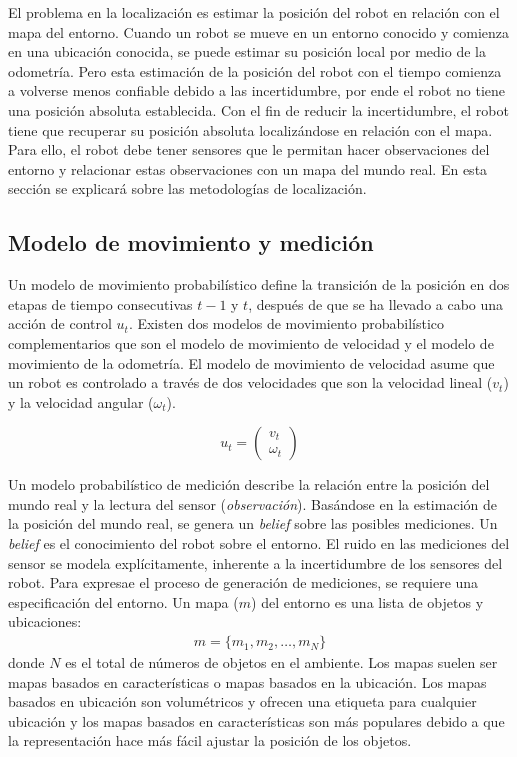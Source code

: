 El problema en la localizaci\'on es estimar la posici\'on del robot en 
relaci\'on con el mapa del entorno. Cuando un robot se mueve en un entorno 
conocido y comienza en una ubicaci\'on conocida, se puede estimar su posici\'on 
local por medio de la odometr\'ia. Pero esta estimaci\'on de la posici\'on del robot
con el tiempo comienza a volverse menos confiable debido a las incertidumbre,
por ende el robot no tiene una posici\'on absoluta establecida. Con el fin de reducir 
la incertidumbre, el robot tiene que recuperar su posici\'on absoluta localiz\'andose 
en relaci\'on con el mapa. Para ello, el robot debe tener sensores que le permitan 
hacer observaciones del entorno y relacionar estas observaciones con un mapa 
del mundo real. En esta secci\'on se explicar\'a sobre las metodolog\'ias 
de localizaci\'on.

\subsection{Modelo de movimiento y medici\'on}

Un modelo de movimiento probabil\'istico define la transici\'on de la posici\'on 
en dos etapas de tiempo consecutivas $t-1$ y $t$, despu\'es de que se ha llevado 
a cabo una acci\'on de control $u_{t}$. Existen dos modelos de movimiento 
probabil\'istico complementarios que son el modelo de movimiento de velocidad y 
el modelo de movimiento de la odometr\'ia. El modelo de movimiento de velocidad 
asume que un robot es controlado a trav\'es de dos velocidades que son la 
velocidad lineal ($v_{t}$) y la velocidad angular ($\omega_{t}$).

\begin{equation}
\label{eqn:modelMotion}
u_{t} = \begin{pmatrix}
v_{t} \\
\omega_{t}
\end{pmatrix}
\end{equation}

Un modelo probabil\'istico de medici\'on describe la relaci\'on entre 
la posici\'on del mundo real y la lectura del sensor 
(\textit{observaci\'on}). Bas\'andose en la estimaci\'on de la posici\'on 
del mundo real, se genera un \textit{belief} sobre las posibles mediciones. Un 
\textit{belief} es el conocimiento del robot sobre el entorno. El ruido en 
las mediciones del sensor se modela expl\'icitamente, inherente a la 
incertidumbre de los sensores del robot. Para expresae el proceso de 
generaci\'on de mediciones, se requiere una especificaci\'on del entorno. Un
mapa ($m$) del entorno es una lista de objetos y ubicaciones:
\begin{align}
m =\{m_{1}, m_{2}, \ldots, m_{N}\}
\end{align}
donde $N$ es el total de n\'umeros de objetos en el ambiente. Los mapas 
suelen ser mapas basados en caracter\'isticas o mapas basados en la 
ubicaci\'on. Los mapas basados en ubicación son volumétricos y ofrecen 
una etiqueta para cualquier ubicación y los mapas basados en características 
son más populares debido a que la representación hace más fácil ajustar la 
posición de los objetos.

